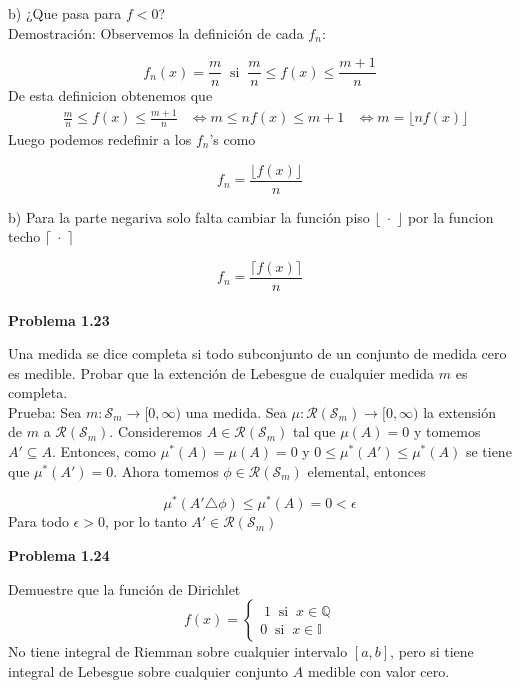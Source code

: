 \documentclass[12pt]{article}
\begin{document}
    b) ¿Que pasa para $f < 0$?
    \\

    Demostraci\'on: Observemos la definici\'on de cada $f_n$:

    \[f_n(x) = \frac{m}{n}\;\; \text{si}\;\; \frac{m}{n} \leq f(x) \leq \frac{m+1}{n}\]
    De esta definicion obtenemos que 
    \begin{equation*}
        \begin{aligned}
            & \frac{m}{n} \leq f(x) \leq \frac{m+1}{n} 
            & \Leftrightarrow m \leq nf(x) \leq m+1 
            & \Leftrightarrow m = \lfloor nf(x) \rfloor
        \end{aligned}
    \end{equation*}
    Luego podemos redefinir a los $f_n$'s como

    \[f_n = \frac{\lfloor f(x) \rfloor}{n}\]

    b) Para la parte negariva solo falta cambiar la funci\'on piso $\lfloor \;\cdot\;\rfloor$ 
    por la funcion techo $\lceil \;\cdotp\;\rceil$

    \[f_n = \frac{\lceil f(x) \rceil}{n}\]
    \\

    \textbf{Problema 1.23}

    Una medida se dice completa si todo subconjunto de un conjunto de medida cero es medible.
    Probar que la extenci\'on de Lebesgue de cualquier medida $m$ es completa.
    \\

    Prueba: Sea $m:\mathscr{S}_m\rightarrow [0,\infty)$ una medida. Sea 
    $\mu:\mathscr{R}(\mathscr{S}_m)\rightarrow [0,\infty)$ la extensi\'on de $m$ a 
    $\mathscr{R}(\mathscr{S}_m)$. Consideremos $A\in \mathscr{R}(\mathscr{S}_m)$ tal que 
    $\mu(A) = 0$ y tomemos $A'\subseteq A$. Entonces, como $\mu^*(A) = \mu(A) = 0$ y 
    $0 \leq \mu^*(A') \leq \mu^*(A)$ se tiene que $\mu^*(A') = 0$. Ahora tomemos 
    $\phi \in \mathscr{R}(\mathscr{S}_m)$ elemental, entonces 

    \[\mu^*(A'\triangle \phi) \leq \mu^*(A) = 0 < \epsilon\]
    Para todo $\epsilon > 0$, por lo tanto $A'\in \mathscr{R}(\mathscr{S}_m)$
    \newpage

    \textbf{Problema 1.24}

    Demuestre que la funci\'on de Dirichlet
    \begin{equation*}
        f(x) = \left\{
            \begin{aligned}
                \;1 \;\; \text{si}\;\; x\in \mathbb{Q} \\
                0 \;\; \text{si}\;\; x\in \mathbb{I}
            \end{aligned}
            \right.
    \end{equation*}
    No tiene integral de Riemman sobre cualquier intervalo $[a,b]$, pero si tiene integral
    de Lebesgue sobre cualquier conjunto $A$ medible con valor cero.
    \\
\end{document}
